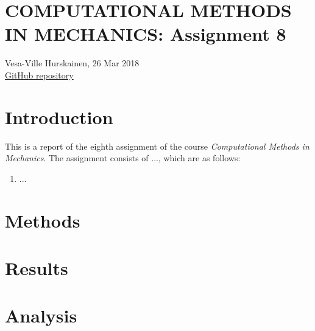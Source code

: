 \documentclass{article}
\begin{document}
	\section*{COMPUTATIONAL METHODS IN MECHANICS: Assignment 8}
	Vesa-Ville Hurskainen, 26 Mar 2018\\
	\href{https://github.com/VesaVilleHurskainen/cmim2018}{GitHub repository}

	\section*{Introduction}
	This is a report of the eighth assignment of the course \textit{Computational Methods in Mechanics}. The assignment consists of ..., which are as follows:
	\begin{enumerate}
		\setlength\itemsep{0pt}
		\item ...
	\end{enumerate}

	\section*{Methods}


	\section*{Results}

	
	\section*{Analysis}
\end{document}
